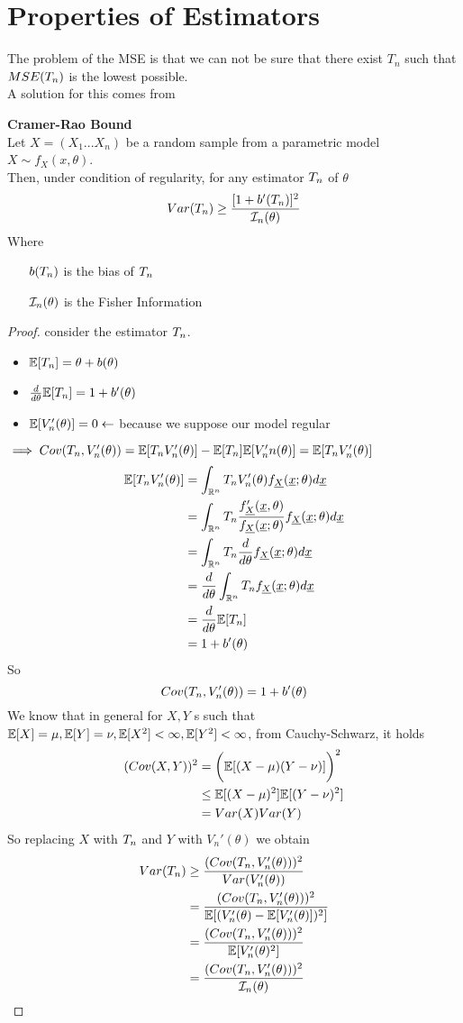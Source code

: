 \section{Properties of Estimators}
The problem of the MSE is that we can not be sure that there exist $T_n$ such that $MSE (T_{n})$ is the lowest possible.\\
A solution for this comes from
\begin{teo}\label{teo:Cramer-Rao Bound}
	\textbf{Cramer-Rao Bound}\\
			Let $X=(X_1... X_n)$ be a random sample from a parametric model $X\sim f_X(x,\theta)$.\\
			Then, under condition of regularity, for any estimator $T_{n}$ of $\theta$ 
			\[
			Var(T_{n})\geq \frac{[1+b'(T_{n})]^2}{\mathcal{I}_n(\theta)}
			\]
Where
\begin{itemize}
	\item[$b(T_{n})$] is the bias of $T_{n}$
	\item[$\mathcal{I}_n(\theta)$] is the Fisher Information
\end{itemize}
\end{teo}
\begin{proof}
	consider the estimator $T_{n}$.
	\begin{itemize}
		\item $\mathbb{E}[T_{n}]=\theta +b(\theta)$
		\item $\frac{d}{d\theta} \mathbb{E}[T_{n}]=1+b'(\theta)$
		\item $\mathbb{E}[V_n'(\theta)]=0 \leftarrow$ because we suppose our model regular
	\end{itemize}
$\implies Cov(T_{n}, V_n'(\theta))=\mathbb{E}[T_{n} V_n'(\theta)] - \mathbb{E}[T_{n}]\mathbb{E}[V_n'n(\theta)]=\mathbb{E}[T_{n} V_n'(\theta)]$ 
\[
\begin{split}
\mathbb{E}[T_{n} V_n'(\theta)]&
=\int_{\mathbb{R}^n}T_{n} V_n'(\theta) f_{\underline X}(\underline{x};\theta) d\underline x\\
&=\int_{\mathbb{R}^n}T_{n} \frac{f_{\underline X}'(\underline x,\theta)}{f_{\underline X}(\underline{x};\theta)}f_{\underline X}(\underline{x};\theta) d\underline x\\
&=\int_{\mathbb{R}^n}T_{n} \frac{d}{d\theta} f_{\underline X}(\underline{x};\theta) d\underline x\\
&=\frac{d}{d\theta} \int_{\mathbb{R}^n}T_{n} f_{\underline X}(\underline{x};\theta) d\underline x\\
&=\frac{d}{d\theta} \mathbb{E}[T_{n}]\\
&=1+b'(\theta)
\end{split}
\]
So
\[
Cov(T_{n},V_n'(\theta))=1+b'(\theta)
\]
We know that in general for $X,Y$ \rv s such that $\mathbb{E}[X]=\mu, \mathbb{E}[Y]=\nu, \mathbb{E}[X^2]<\infty, \mathbb{E}[Y^2]<\infty$, from Cauchy-Schwarz, it holds
\[
\begin{split}
(Cov(X,Y))^2&=\bigg( \mathbb{E}[(X-\mu)(Y-\nu)] \bigg)^2\\
&\leq  \mathbb{E}[(X-\mu)^2] \mathbb{E}[(Y-\nu)^2]\\
&= Var(X)Var(Y)
\end{split}
\]
So replacing $X$ with $T_{n}$ and $Y$ with $V_n'(\theta)$ we  obtain
\[
\begin{split}
Var(T_{n})&\geq \frac{(Cov(T_{n},V_n'(\theta)))^2}{Var(V_n'(\theta))}\\
&=\frac{(Cov(T_{n},V_n'(\theta)))^2}{\mathbb{E}[(V_n'(\theta)-\mathbb{E}[V_n'(\theta)])^2]}\\
&=\frac{(Cov(T_{n},V_n'(\theta)))^2}{\mathbb{E}[V_n'(\theta)^2]}\\
&=\frac{(Cov(T_{n},V_n'(\theta)))^2}{\mathcal{I}_n(\theta)}
\end{split}
\]
\end{proof}
